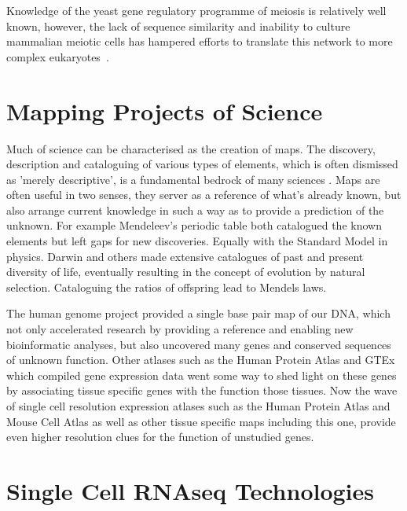 
Knowledge of the yeast gene regulatory programme of meiosis is relatively well known, however, the lack of sequence similarity and inability to culture mammalian meiotic cells has hampered efforts to translate this network to more complex eukaryotes~\cite{Brar2011HighResolution,Mata2002Transcriptional,Chu1998Transcriptional,Handel2010Genetics}.

\section{Mapping Projects of Science}

Much of science can be characterised as the creation of maps. The discovery, description and cataloguing of various types of elements, which is often dismissed as 'merely descriptive', is a fundamental bedrock of many sciences \cite{Grimaldi2007}. Maps are often useful in two senses, they server as a reference of what's already known, but also arrange current knowledge in such a way as to provide a prediction of the unknown. For example Mendeleev's periodic table both catalogued the known elements but left gaps for new discoveries. Equally with the Standard Model in physics. Darwin and others made extensive catalogues of past and present diversity of life, eventually resulting in the concept of evolution by natural selection. Cataloguing the ratios of offspring lead to Mendels laws.

The human genome project provided a single base pair map of our DNA, which not only accelerated research by providing a reference and enabling new bioinformatic analyses, but also uncovered many genes and conserved sequences of unknown function. Other atlases such as the Human Protein Atlas and GTEx which compiled gene expression data went some way to shed light on these genes by associating tissue specific genes with the function those tissues. Now the wave of single cell resolution expression atlases such as the Human Protein Atlas and Mouse Cell Atlas as well as other tissue specific maps including this one, provide even higher resolution clues for the function of unstudied genes.


\section{Single Cell RNAseq Technologies}


